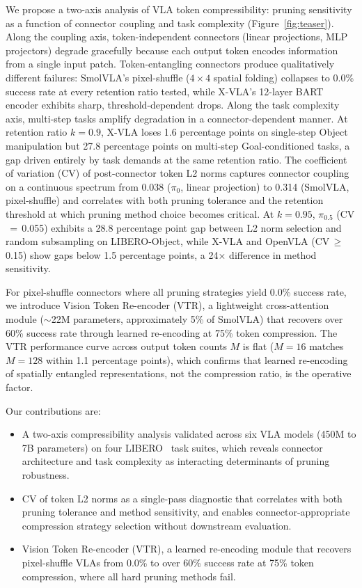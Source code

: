 We propose a two-axis analysis of VLA token compressibility: pruning sensitivity as a function of connector coupling and task complexity (Figure~\ref{fig:teaser}). Along the coupling axis, token-independent connectors (linear projections, MLP projectors) degrade gracefully because each output token encodes information from a single input patch. Token-entangling connectors produce qualitatively different failures: SmolVLA's pixel-shuffle ($4{\times}4$ spatial folding) collapses to 0.0\% success rate at every retention ratio tested, while X-VLA's 12-layer BART encoder exhibits sharp, threshold-dependent drops. Along the task complexity axis, multi-step tasks amplify degradation in a connector-dependent manner. At retention ratio $k{=}0.9$, X-VLA loses 1.6 percentage points on single-step Object manipulation but 27.8 percentage points on multi-step Goal-conditioned tasks, a gap driven entirely by task demands at the same retention ratio. The coefficient of variation (CV) of post-connector token L2 norms captures connector coupling on a continuous spectrum from 0.038 ($\pi_0$, linear projection) to 0.314 (SmolVLA, pixel-shuffle) and correlates with both pruning tolerance and the retention threshold at which pruning method choice becomes critical. At $k{=}0.95$, $\pi_0.5$ (CV$\,{=}\,$0.055) exhibits a 28.8 percentage point gap between L2 norm selection and random subsampling on LIBERO-Object, while X-VLA and OpenVLA (CV$\,{\geq}\,$0.15) show gaps below 1.5 percentage points, a 24$\times$ difference in method sensitivity.

For pixel-shuffle connectors where all pruning strategies yield 0.0\% success rate, we introduce Vision Token Re-encoder (VTR), a lightweight cross-attention module (${\sim}$22M parameters, approximately 5\% of SmolVLA) that recovers over 60\% success rate through learned re-encoding at 75\% token compression. The VTR performance curve across output token counts $M$ is flat ($M{=}16$ matches $M{=}128$ within 1.1 percentage points), which confirms that learned re-encoding of spatially entangled representations, not the compression ratio, is the operative factor.

Our contributions are:
\begin{itemize}
    \item A two-axis compressibility analysis validated across six VLA models (450M to 7B parameters) on four LIBERO~\cite{liu2023libero} task suites, which reveals connector architecture and task complexity as interacting determinants of pruning robustness.
    \item CV of token L2 norms as a single-pass diagnostic that correlates with both pruning tolerance and method sensitivity, and enables connector-appropriate compression strategy selection without downstream evaluation.
    \item Vision Token Re-encoder (VTR), a learned re-encoding module that recovers pixel-shuffle VLAs from 0.0\% to over 60\% success rate at 75\% token compression, where all hard pruning methods fail.
\end{itemize}
